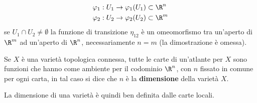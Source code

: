 \documentclass[10pt, letterpaper]{report}
\begin{document}
\begin{align}
    &\varphi_1:U_1\rightarrow\varphi_1(U_1)\subset \R^n\\ 
    &\varphi_2:U_2\rightarrow\varphi_2(U_2)\subset \R^m
\end{align}
se $U_1\cap U_2\ne \emptyset$ la funzione di transizione $\eta_{12}$ è un omeomorfismo tra un'aperto di $\R^m$ ad un'aperto di $\R^n$, necessariamente $n=m$ (la dimostrazione è omessa).
\begin{osservazione}
Se $X$ è una varietà topologica connessa, tutte le carte di un'atlante per $X$ sono funzioni che hanno come ambiente per il codominio $\R^n$, con $n$ fissato in comune per ogni carta, in tal caso si dice che $n$ è la \textbf{dimensione} della varietà $X$.
\end{osservazione}
La dimensione di una varietà è quindi ben definita dalle carte locali.
\end{document}
